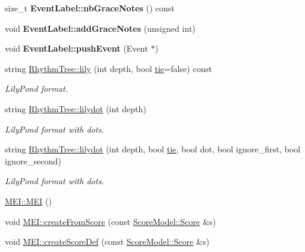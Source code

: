 \begin{DoxyCompactItemize}
size\+\_\+t {\bfseries Event\+Label\+::nb\+Grace\+Notes} () const
\item 
\mbox{\label{group__output_ga77779608bf4588f37330cecaf4cc2f1e}} 
void {\bfseries Event\+Label\+::add\+Grace\+Notes} (unsigned int)
\item 
\mbox{\label{group__output_ga6a71e2488e33f2556ee9051d0bc88820}} 
void {\bfseries Event\+Label\+::push\+Event} (Event $\ast$)
\item 
string \mbox{\hyperlink{group__output_gafcd0d23d1cdb8cd92fbaec2fac51d259}{Rhythm\+Tree\+::lily}} (int depth, bool \mbox{\hyperlink{group__output_ga3933e83072d4e7c3bb3d19d25df90b47}{tie}}=false) const
\begin{DoxyCompactList}\small\item\em Lily\+Pond format. \end{DoxyCompactList}\item 
\mbox{\label{group__output_ga93aca0f691a35a081d51eaad06e8ce50}} 
string \mbox{\hyperlink{group__output_ga93aca0f691a35a081d51eaad06e8ce50}{Rhythm\+Tree\+::lilydot}} (int depth)
\begin{DoxyCompactList}\small\item\em Lily\+Pond format with dots. \end{DoxyCompactList}\item 
\mbox{\label{group__output_ga89f5bf140b902f886be124d620ac8474}} 
string \mbox{\hyperlink{group__output_ga89f5bf140b902f886be124d620ac8474}{Rhythm\+Tree\+::lilydot}} (int depth, bool \mbox{\hyperlink{group__output_ga3933e83072d4e7c3bb3d19d25df90b47}{tie}}, bool dot, bool ignore\+\_\+first, bool ignore\+\_\+second)
\begin{DoxyCompactList}\small\item\em Lily\+Pond format with dots. \end{DoxyCompactList}\item 
\mbox{\hyperlink{group__output_ga67acb233e47d9942cb678fb24b67f799}{M\+E\+I\+::\+M\+EI}} ()
\item 
void \mbox{\hyperlink{group__output_ga28b9390a3699a9ae7abdba51cb3cb7d5}{M\+E\+I\+::create\+From\+Score}} (const \mbox{\hyperlink{classScoreModel_1_1Score}{Score\+Model\+::\+Score}} \&s)
\item 
void \mbox{\hyperlink{group__output_gaec3627352aed16ef31dfabe7d243c476}{M\+E\+I\+::create\+Score\+Def}} (const \mbox{\hyperlink{classScoreModel_1_1Score}{Score\+Model\+::\+Score}} \&s)

\end{DoxyCompactItemize}
